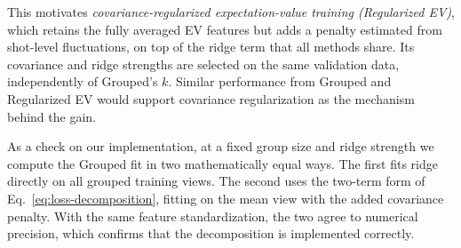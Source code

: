 This motivates \emph{covariance-regularized expectation-value training
(Regularized EV)}, which retains the fully averaged EV features but adds a
penalty estimated from shot-level fluctuations, on top of the ridge term that
all methods share. Its covariance and ridge strengths are selected on the same
validation data, independently of Grouped's $k$. Similar performance from
Grouped and Regularized EV would support covariance regularization as the
mechanism behind the gain.

As a check on our implementation, at a fixed group size and ridge strength we
compute the Grouped fit in two mathematically equal ways. The first fits ridge
directly on all grouped training views. The second uses the two-term form of
Eq.~\eqref{eq:loss-decomposition}, fitting on the mean view with the added
covariance penalty. With the same feature standardization, the two agree to
numerical precision, which confirms that the decomposition is implemented
correctly.
